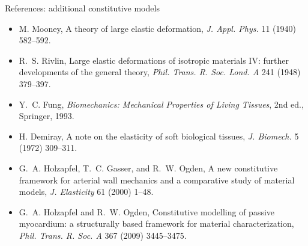 \documentclass[aspectratio=169,11pt]{beamer}
\begin{document}
\begin{frame}{References: additional constitutive models}
\scriptsize
\begin{itemize}\itemsep4pt
  \item M. Mooney, A theory of large elastic deformation, \emph{J. Appl. Phys.} 11 (1940) 582--592.
  \item R.~S. Rivlin, Large elastic deformations of isotropic materials IV: further developments of the general theory, \emph{Phil. Trans. R. Soc. Lond. A} 241 (1948) 379--397.
  \item Y.~C. Fung, \emph{Biomechanics: Mechanical Properties of Living Tissues}, 2nd ed., Springer, 1993.
  \item H. Demiray, A note on the elasticity of soft biological tissues, \emph{J. Biomech.} 5 (1972) 309--311.
  \item G.~A. Holzapfel, T.~C. Gasser, and R.~W. Ogden, A new constitutive framework for arterial wall mechanics and a comparative study of material models, \emph{J. Elasticity} 61 (2000) 1--48.
  \item G.~A. Holzapfel and R.~W. Ogden, Constitutive modelling of passive myocardium: a structurally based framework for material characterization, \emph{Phil. Trans. R. Soc. A} 367 (2009) 3445--3475.
\end{itemize}
\medskip
{\tiny\color{DarkGray}\aidisclosure\par}
\end{frame}
\end{document}

